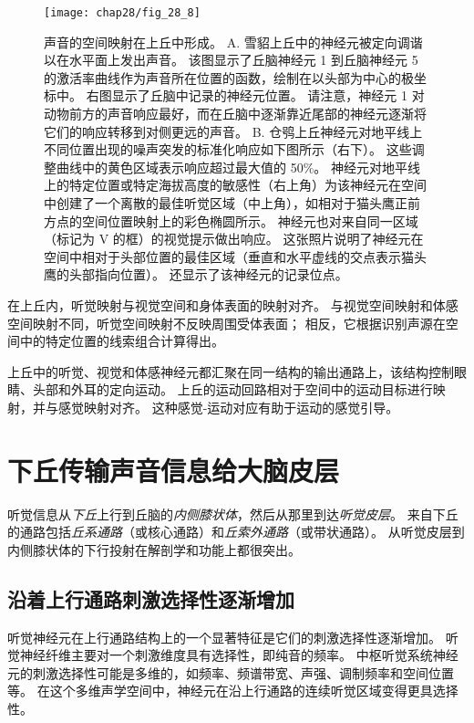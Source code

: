 \begin{figure}[htbp]
	\centering
	\texttt{[image: chap28/fig\_28\_8]}
	\caption{声音的空间映射在上丘中形成。
		A. 雪貂上丘中的神经元被定向调谐以在水平面上发出声音。
		该图显示了丘脑神经元 1 到丘脑神经元 5 的激活率曲线作为声音所在位置的函数，绘制在以头部为中心的极坐标中。
		右图显示了丘脑中记录的神经元位置。
		请注意，神经元 1 对动物前方的声音响应最好，而在丘脑中逐渐靠近尾部的神经元逐渐将它们的响应转移到对侧更远的声音\cite{king1999sensory}。
		B. 仓鸮上丘神经元对地平线上不同位置出现的噪声突发的标准化响应如下图所示（右下）。
		这些调整曲线中的黄色区域表示响应超过最大值的 50\%。
		神经元对地平线上的特定位置或特定海拔高度的敏感性（右上角）为该神经元在空间中创建了一个离散的最佳听觉区域（中上角），如相对于猫头鹰正前方点的空间位置映射上的彩色椭圆所示。
		神经元也对来自同一区域（标记为 V 的框）的视觉提示做出响应。
		这张照片说明了神经元在空间中相对于头部位置的最佳区域（垂直和水平虚线的交点表示猫头鹰的头部指向位置）。
		还显示了该神经元的记录位点\cite{cohen1999maps}。}
	\label{fig:28_8}
\end{figure}


在上丘内，听觉映射与视觉空间和身体表面的映射对齐。
与视觉空间映射和体感空间映射不同，听觉空间映射不反映周围受体表面；
相反，它根据识别声源在空间中的特定位置的线索组合计算得出。


上丘中的听觉、视觉和体感神经元都汇聚在同一结构的输出通路上，该结构控制眼睛、头部和外耳的定向运动。
上丘的运动回路相对于空间中的运动目标进行映射，并与感觉映射对齐。
这种感觉-运动对应有助于运动的感觉引导。



\section{下丘传输声音信息给大脑皮层}

听觉信息从\textit{下丘}上行到丘脑的\textit{内侧膝状体}，然后从那里到达\textit{听觉皮层}。
来自下丘的通路包括\textit{丘系通路}（或核心通路）和\textit{丘索外通路}（或带状通路）。
从听觉皮层到内侧膝状体的下行投射在解剖学和功能上都很突出。



\subsection{沿着上行通路刺激选择性逐渐增加}

听觉神经元在上行通路结构上的一个显著特征是它们的刺激选择性逐渐增加。
听觉神经纤维主要对一个刺激维度具有选择性，即纯音的频率。
中枢听觉系统神经元的刺激选择性可能是多维的，如频率、频谱带宽、声强、调制频率和空间位置等。
在这个多维声学空间中，神经元在沿上行通路的连续听觉区域变得更具选择性。


